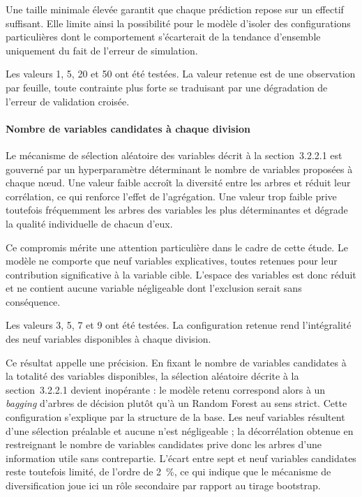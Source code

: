 Une taille minimale élevée garantit que chaque prédiction repose sur un effectif 
suffisant. Elle limite ainsi la possibilité pour le modèle d'isoler des configurations 
particulières dont le comportement s'écarterait de la tendance d'ensemble uniquement du 
fait de l'erreur de simulation.

Les valeurs 1, 5, 20 et 50 ont été testées. La valeur retenue est de une
observation par feuille, toute contrainte plus forte se traduisant par une
dégradation de l'erreur de validation croisée.

\paragraph{Nombre de variables candidates à chaque division}
Le mécanisme de sélection aléatoire des variables décrit à la section~3.2.2.1 est 
gouverné par un hyperparamètre déterminant le nombre de variables proposées à chaque 
nœud. Une valeur faible accroît la diversité entre les arbres et réduit leur corrélation, 
ce qui renforce l'effet de l'agrégation. Une valeur trop faible prive toutefois 
fréquemment les arbres des variables les plus déterminantes et dégrade la qualité 
individuelle de chacun d'eux.

Ce compromis mérite une attention particulière dans le cadre de cette étude. Le modèle ne 
comporte que neuf variables explicatives, toutes retenues pour leur contribution 
significative à la variable cible. L'espace des variables est donc 
réduit et ne contient aucune variable négligeable dont l'exclusion serait sans 
conséquence.

Les valeurs 3, 5, 7 et 9 ont été testées. La configuration retenue rend
l'intégralité des neuf variables disponibles à chaque division.

Ce résultat appelle une précision. En fixant le nombre de variables
candidates à la totalité des variables disponibles, la sélection aléatoire
décrite à la section~3.2.2.1 devient inopérante : le modèle retenu correspond
alors à un \emph{bagging} d'arbres de décision plutôt qu'à un Random Forest
au sens strict. Cette configuration s'explique par la structure de la base.
Les neuf variables résultent d'une sélection préalable et aucune n'est
négligeable ; la décorrélation obtenue en restreignant le nombre de variables
candidates prive donc les arbres d'une information utile sans contrepartie.
L'écart entre sept et neuf variables candidates reste toutefois limité, de
l'ordre de 2~\%, ce qui indique que le mécanisme de diversification joue ici
un rôle secondaire par rapport au tirage bootstrap.

